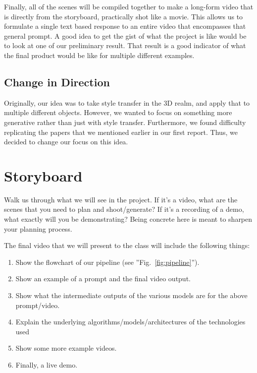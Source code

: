 \documentclass[conference]{IEEEtran}
\begin{document}
Finally, all of the scenes will be compiled together to make a long-form video that is directly from the storyboard, practically shot like a movie. This allows us to formulate a single text based response to an entire video that encompasses that general prompt. A good idea to get the gist of what the project is like would be to look at one of our preliminary result. That result is a good indicator of what the final product would be like for multiple different examples.

\subsection{Change in Direction}

Originally, our idea was to take style transfer in the 3D realm, and apply that to multiple different objects. However, we wanted to focus on something more generative rather than just with style transfer. Furthermore, we found difficulty replicating the papers that we mentioned earlier in our first report. Thus, we decided to change our focus on this idea.

\section{Storyboard}

\begin{tcolorbox}
Walk us through what we will see in the project. If it’s a video, what are the scenes that you need to plan and shoot/generate? If it’s a recording of a demo, what exactly will you be demonstrating? Being concrete here is meant to sharpen your planning process.
\end{tcolorbox}

The final video that we will present to the class will include the following things:
\begin{enumerate}
    \item Show the flowchart of our pipeline (see ''Fig.~\ref{fig:pipeline}'').
    \item Show an example of a prompt and the final video output.
    \item Show what the intermediate outputs of the various models are for the
    above prompt/video.
    \item Explain the underlying algorithms/models/architectures of the technologies used
    \item Show some more example videos.
    \item Finally, a live demo.
\end{enumerate}
\end{document}
